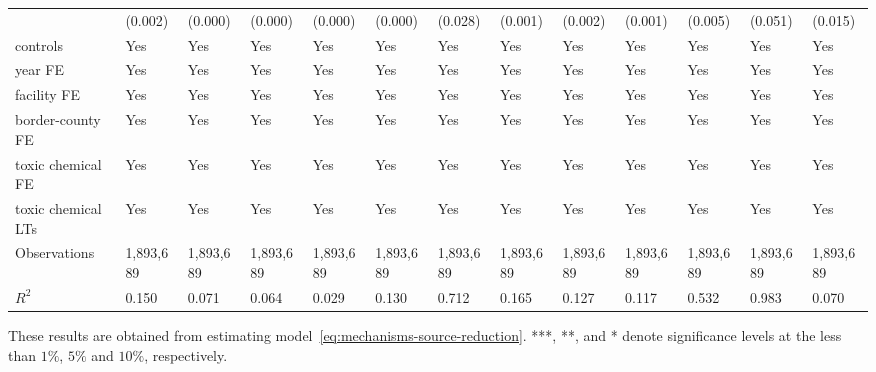 \begin{table}[H]
{\begin{tabular}{@{}lllllllllllll@{}}
            & (0.002)    & (0.000)             & (0.000)                & (0.000)         & (0.000)      & (0.028)    & (0.001)   & (0.002)   & (0.001)       & (0.005)  & (0.051)    & (0.015)  \\
            controls           & Yes        & Yes                 & Yes                    & Yes             & Yes          & Yes        & Yes       & Yes       & Yes           & Yes           & Yes                    & Yes       \\
            year FE            & Yes        & Yes                 & Yes                    & Yes             & Yes          & Yes        & Yes       & Yes       & Yes           & Yes           & Yes                    & Yes       \\
            facility FE        & Yes        & Yes                 & Yes                    & Yes             & Yes          & Yes        & Yes       & Yes       & Yes           & Yes           & Yes                    & Yes       \\
            border-county FE   & Yes        & Yes                 & Yes                    & Yes             & Yes          & Yes        & Yes       & Yes       & Yes           & Yes           & Yes                    & Yes       \\
            toxic chemical FE  & Yes        & Yes                 & Yes                    & Yes             & Yes          & Yes        & Yes       & Yes       & Yes           & Yes           & Yes                    & Yes       \\
            toxic chemical LTs & Yes        & Yes                 & Yes                    & Yes             & Yes          & Yes        & Yes       & Yes       & Yes           & Yes           & Yes                    & Yes       \\\midrule
            Observations       & 1,893,689  & 1,893,689           & 1,893,689              & 1,893,689       & 1,893,689    & 1,893,689  & 1,893,689 & 1,893,689 & 1,893,689     & 1,893,689  & 1,893,689  & 1,893,689 \\
            $R^2$              & 0.150      & 0.071               & 0.064                  & 0.029           & 0.130        & 0.712      & 0.165     & 0.127     & 0.117         & 0.532         & 0.983                  & 0.070     \\ \bottomrule\bottomrule
        \end{tabular}%
    }
    \begin{minipage}{18cm}
        \vspace{0.05in}
        These results are obtained from estimating model~\ref{eq:mechanisms-source-reduction}. ***, **, and * denote significance levels at the less than $1\%$, $5\%$ and $10\%$, respectively.
    \end{minipage}
\end{table}